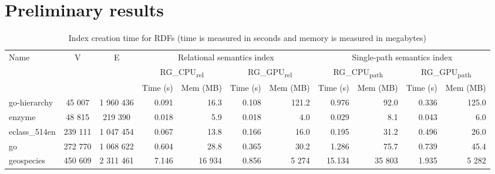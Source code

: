 \documentclass[sigconf, nonacm]{acmart}
\begin{document}
\section{Preliminary results}
{\setlength{\tabcolsep}{0.4em}
	\begin{table}[ht]
		\caption{Index creation time for RDFs (time is measured in seconds and memory is measured in megabytes)}
		\label{tbl:tableRDFQ1}
		\begin{tabular}{| l | c | c | r  r | r  r | r  r | r  r |}
			\hline
			
			\multirow{3}{*}{Name}  & \multirow{3}{*}{V} & \multirow{3}{*}{E} & \multicolumn{4}{|c|}{Relational semantics index}	&	\multicolumn{4}{|c|}{Single-path semantics index} \\
			\cline{4-11}
			& & &	\multicolumn{2}{|c|}{RG\_CPU\textsubscript{rel}}	&	\multicolumn{2}{|c|}{RG\_GPU\textsubscript{rel}} &	\multicolumn{2}{|c|}{RG\_CPU\textsubscript{path}}	&	\multicolumn{2}{|c|}{RG\_GPU\textsubscript{path}}	 \\
			\cline{4-11}
			&  & &  Time (s)     & Mem (MB) & Time (s)     & Mem (MB)  &  Time (s)     & Mem (MB) & Time  (s)   & Mem (MB) \\
			\hline
			\hline
			go-hierarchy                & 45 007  & 1 960 436 & 0.091 & 16.3 & 0.108 & 121.2    & 0.976 & 92.0   & 0.336 & 125.0  \\
			enzyme                      & 48 815  & 219 390  & 0.018 & 5.9 & 0.018 & 4.0        & 0.029 & 8.1  & 0.043 & 6.0    \\	
			eclass\_514en                 & 239 111  & 1 047 454 & 0.067 & 13.8  & 0.166 & 16.0     & 0.195 & 31.2 & 0.496 & 26.0   \\
			go                          & 272 770  & 1 068 622 & 0.604  & 28.8  & 0.365 & 30.2     & 1.286 & 75.7 & 0.739 & 45.4 \\
			geospecies                        & 450 609  & 2 311 461  & 7.146 & 16 934   & 0.856 & 5 274      & 15.134 & 35 803  & 1.935  & 5 282  \\
			\hline
		\end{tabular}
	\end{table}
}
\end{document}
